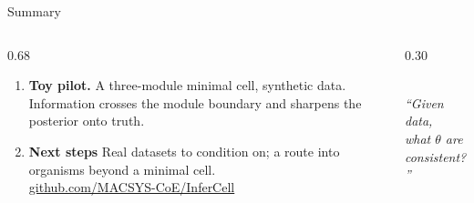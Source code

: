 \documentclass[aspectratio=169]{beamer}
\begin{document}
\begin{frame}{Summary}
\begin{columns}[c,onlytextwidth]
\begin{column}{0.68\textwidth}
\begin{enumerate}
				\item \textbf{Toy pilot.} A three-module minimal cell, synthetic data.  Information crosses the module boundary and
				sharpens the posterior onto truth.
				\item \textbf{Next steps} Real datasets to condition
				on; a route into organisms beyond a minimal cell.\\[2pt]
				{\scriptsize\href{https://github.com/MACSYS-CoE/InferCell}{github.com/MACSYS-CoE/InferCell}}
			\end{enumerate}
		\end{column}
		\begin{column}{0.30\textwidth}
			\centering
			\\[6pt]
			{\scriptsize\itshape ``Given data,\\ what $\theta$ are consistent?''}
		\end{column}
	\end{columns}
\end{frame}
\end{document}
